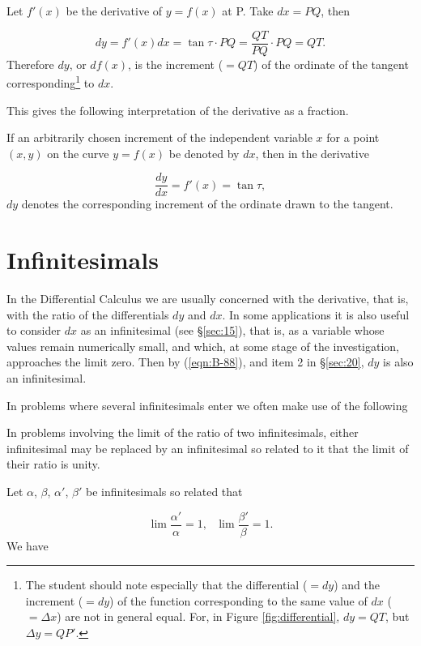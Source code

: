 Let $f'(x)$ be the derivative of $y = f(x)$ at P. Take $dx = PQ$, then

\[
    dy = f'(x)dx = \tan \tau \cdot PQ = \frac{QT}{PQ} \cdot PQ = QT.
\]
Therefore $dy$, or $df(x)$, is the increment ($= QT$) of 
the ordinate of the tangent corresponding\footnote{The student 
should note especially that the differential ($= dy$) and the 
increment ($= dy$) of the function corresponding to the same 
value of $dx$ ($= Δx$) are not in general equal. For, 
in Figure \ref{fig:differential}, $dy = QT$, but 
$Δy = QP'$.}  to $dx$.

This gives the following interpretation of the derivative as a fraction.

If an arbitrarily chosen increment of the independent 
variable $x$ for a point $(x, y)$ on the curve $y = f(x)$ be 
denoted by $dx$, then in the derivative

\[
    \frac{dy}{dx} = f'(x) = \tan \tau,
\]
$dy$ denotes the corresponding increment of the ordinate 
drawn to the tangent.

\section{Infinitesimals}

In the Differential Calculus we are usually concerned 
with the derivative, that is, with the ratio of the 
differentials $dy$ and $dx$. In some applications it is also 
useful to consider $dx$ as an infinitesimal 
(see \S \ref{sec:15}), %
that is, as a variable whose values remain numerically 
small, and which, at some stage of the investigation, approaches 
the limit zero. Then by (\ref{eqn:B-88}), %
and item 2 in \S \ref{sec:20}, %
$dy$ is also an infinitesimal.

In problems where several infinitesimals enter we often 
make use of the following

\begin{theorem}
\label{thrm:89}
{\rm 
In problems involving the limit of the ratio of two 
infinitesimals, either infinitesimal may be replaced 
by an infinitesimal so related to it that the limit of 
their ratio is unity.
}
\end{theorem}

\pf
 Let $\alpha$, $\beta$, $\alpha'$, $\beta'$ be 
infinitesimals so related that

\[
\lim \frac{\alpha'}{\alpha} = 1,\ \ \ \lim \frac{\beta'}{\beta} = 1.
\]
We have 

